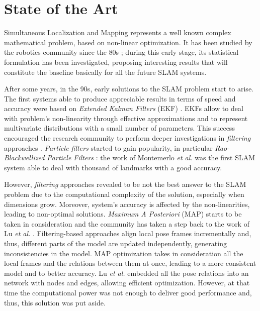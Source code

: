 \chapter{State of the Art}\label{ch:related}
\lettrine[lines=2]{S}{}imultaneous Localization and Mapping represents a well known complex mathematical problem, based on non-linear optimization. It has been studied by the robotics community since the 80s \cite{durrant2006simultaneous} \cite{bailey2006simultaneous}; during this early stage, its statistical formulation has been investigated, proposing interesting results that will constitute the baseline basically for all the future SLAM systems.

After some years, in the 90s, early solutions to the SLAM problem start to arise. The first systems able to produce appreciable results in terms of speed and accuracy were based on \textit{Extended Kalman Filters} (EKF) \cite{leonard1990dynamic} \cite{dissanayake2001solution}. EKFs allow to deal with problem's non-linearity through effective approximations and to represent multivariate distributions with a small number of parameters. This success encouraged the research community to perform deeper investigations in \textit{filtering} approaches \cite{aulinas2008filtering_review}. \textit{Particle filters} started to gain popularity, in particular \textit{Rao-Blackwellized Particle Filters} \cite{grisetti2005improving}: the work of Montemerlo \textit{et al.} \cite{montemerlo2002fastslam} was the first SLAM system able to deal with thousand of landmarks with a good accuracy. 

However, \textit{filtering} approaches revealed to be not the best answer to the SLAM problem due to the computational complexity of the solution, especially when dimensions grow. Moreover, system's accuracy is affected by the non-linearities, leading to non-optimal solutions. \textit{Maximum A Posteriori} (MAP) starts to be taken in consideration and the community has taken a step back to the work of Lu \textit{et al.} \cite{lu1997globally}. Filtering-based approaches align local pose frames incrementally and, thus, different parts of the model are updated independently, generating inconsistencies in the model. MAP optimization takes in consideration all the local frames and the relations between them at once, leading to a more consistent model and to better accuracy. Lu \textit{et al.} embedded all the pose relations into an network with nodes and edges, allowing efficient optimization. However, at that time the computational power was not enough to deliver good performance and, thus, this solution was put aside.

